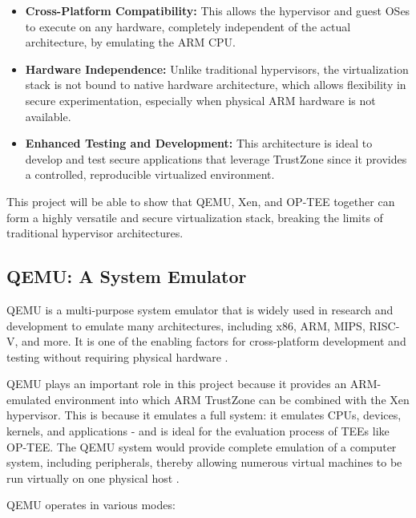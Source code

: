 \documentclass[acmtog]{acmart}
\begin{document}
\begin{itemize}
    \item \textbf{Cross-Platform Compatibility:} This allows the hypervisor and guest OSes to execute on any hardware, completely independent of the actual architecture, by emulating the ARM CPU.
    \item \textbf{Hardware Independence:} Unlike traditional hypervisors, the virtualization stack is not bound to native hardware architecture, which allows flexibility in secure experimentation, especially when physical ARM hardware is not available.
    \item \textbf{Enhanced Testing and Development:} This architecture is ideal to develop and test secure applications that leverage TrustZone since it provides a controlled, reproducible virtualized environment.
\end{itemize}
This project will be able to show that QEMU, Xen, and OP-TEE together can form a highly versatile and secure virtualization stack, breaking the limits of traditional hypervisor architectures.


\subsection{QEMU: A System Emulator}
QEMU is a multi-purpose system emulator that is widely used in research and development to emulate many architectures, including x86, ARM, MIPS, RISC-V, and more. It is one of the enabling factors for cross-platform development and testing without requiring physical hardware \cite{efficient_virtualization, partemu, qemu_fast_portable}. \cite{10.5555/1247360.1247401}

QEMU plays an important role in this project because it provides an ARM-emulated environment into which ARM TrustZone can be combined with the Xen hypervisor. This is because it emulates a full system: it emulates CPUs, devices, kernels, and applications - and is ideal for the evaluation process of TEEs like OP-TEE. The QEMU system would provide complete emulation of a computer system, including peripherals, thereby allowing numerous virtual machines to be run virtually on one physical host \cite{efficient_virtualization}.

QEMU operates in various modes:
\end{document}
